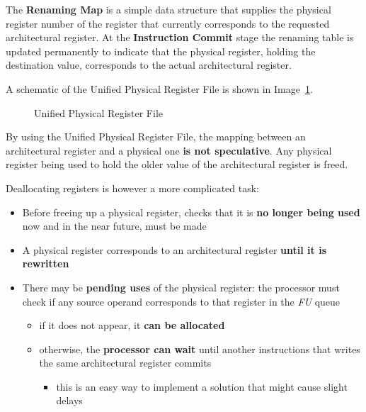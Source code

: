 \documentclass[english]{article}
\begin{document}
The \textbf{Renaming Map} is a simple data structure that supplies the physical register number of the register that currently corresponds to the requested architectural register.
At the \textbf{Instruction Commit} stage the renaming table is updated permanently to indicate that the physical register, holding the destination value, corresponds to the actual architectural register.

A schematic of the Unified Physical Register File is shown in Image~\ref{fig:unified-physical-register-file}.

\begin{figure}[htbp]
  \bigskip
  \centering
  \caption{Unified Physical Register File}
  \label{fig:unified-physical-register-file}
  \bigskip
\end{figure}

\bigskip
By using the Unified Physical Register File, the mapping between an architectural register and a physical one \textbf{is not speculative}.
Any physical register being used to hold the older value of the architectural register is freed.

Deallocating registers is however a more complicated task:

\begin{itemize}
  \item Before freeing up a physical register, checks that it is \textbf{no longer being used} now and in the near future, must be made
  \item A physical register corresponds to an architectural register \textbf{until it is rewritten}
  \item There may be \textbf{pending uses} of the physical register: the processor must check if any source operand corresponds to that register in the \textit{FU} queue
        \begin{itemize}
          \item if it does not appear, it \textbf{can be allocated}
          \item otherwise, the \textbf{processor can wait} until another instructions that writes the same architectural register commits
                \begin{itemize}
                  \item this is an easy way to implement a solution that might cause slight delays
                \end{itemize}
        \end{itemize}
\end{itemize}
\end{document}
